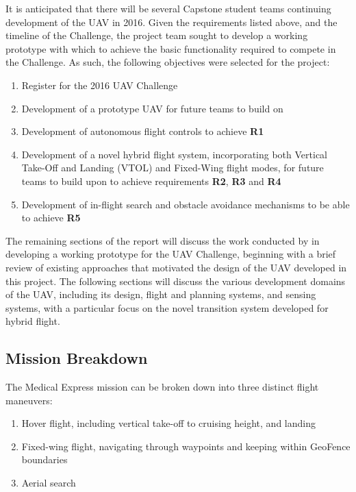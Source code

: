 It is anticipated that there will be several Capstone student teams continuing development of the UAV in 2016. Given the requirements listed above, and the timeline of the Challenge, the \ID project team sought to develop a working prototype with which to achieve the basic functionality required to compete in the Challenge. As such, the following objectives were selected for the project:
\begin{enumerate}[label=\bfseries O\arabic*:] \itemsep-2pt
	\item Register for the 2016 UAV Challenge
	\item Development of a prototype UAV for future teams to build on
	\item Development of autonomous flight controls to achieve \textbf{R1}
	\item Development of a novel hybrid flight system, incorporating both Vertical Take-Off and Landing (VTOL) and Fixed-Wing flight modes, for future teams to build upon to achieve requirements \textbf{R2}, \textbf{R3} and \textbf{R4}
	\item Development of in-flight search and obstacle avoidance mechanisms to be able to achieve \textbf{R5}
\end{enumerate}

The remaining sections of the report will discuss the work conducted by \ID in developing a working prototype for the UAV Challenge, beginning with a brief review of existing approaches that motivated the design of the UAV developed in this project. The following sections will discuss the various development domains of the UAV, including its design, flight and planning systems, and sensing systems, with a particular focus on the novel transition system developed for hybrid flight.

\subsection{Mission Breakdown}
\label{sec:flightmaneuvers_exec}
The Medical Express mission can be broken down into three distinct flight maneuvers:
\begin{enumerate}[label=\bfseries M\arabic*:] \itemsep-2pt
	\item Hover flight, including vertical take-off to cruising height, and landing
	\item Fixed-wing flight, navigating through waypoints and keeping within GeoFence boundaries
	\item Aerial search
\end{enumerate}


